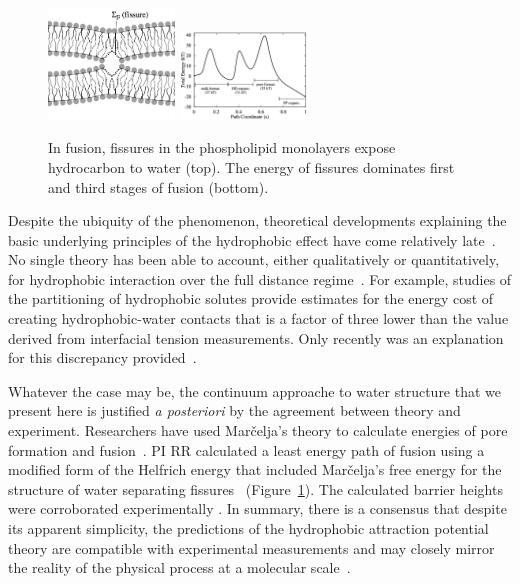 \begin{figure}
  \vspace{-5pt}
\includegraphics[width=0.3\textwidth]{figures/Background/Fissure.jpg}
\includegraphics[width=0.3\textwidth]{figures/Background/Landscape.jpg}
\caption{\label{fig:fissure} In fusion, fissures in the phospholipid
  monolayers expose hydrocarbon to water (top). The energy of fissures
  dominates first and third stages of fusion (bottom).
}
\end{figure}
Despite the ubiquity of
the phenomenon, theoretical developments explaining the basic underlying
principles of the hydrophobic effect have come relatively
late~\cite{Ch05}.
No single theory has been able to account, either qualitatively
or quantitatively,
for hydrophobic interaction over the full distance
regime~\cite{Lum1999, Lin2005, Meyer2006, Ducker2016}.
For example, studies of the partitioning of
hydrophobic solutes provide estimates for the energy cost of creating
hydrophobic-water contacts
that is a factor of three lower than the value derived from interfacial
tension measurements. Only recently was an explanation for this
discrepancy provided~\cite{Jackson2016}.

Whatever the case may be, the continuum approache to water structure
that we present here is justified
\textit{a posteriori} by the agreement between theory and experiment.
Researchers have used Mar\v{c}elja's theory to calculate
energies of pore formation and fusion~\cite{Gletal88, Aketal17,
RyKlYaCo16}.
PI RR calculated a least energy path 
of fusion using a modified form of the Helfrich energy that
included Mar\v{c}elja's free energy for the structure of water
separating fissures~\cite{RyKlYaCo16} (Figure~\ref{fig:fissure}).
The calculated barrier heights were 
corroborated experimentally \cite{FrRoPi17}. In summary,
there is a consensus that despite its apparent simplicity, the predictions
of the hydrophobic attraction potential theory are compatible with
experimental measurements and may closely mirror the reality of
the physical process at a molecular scale~\cite{FrRoPi17, Fretal21}.

